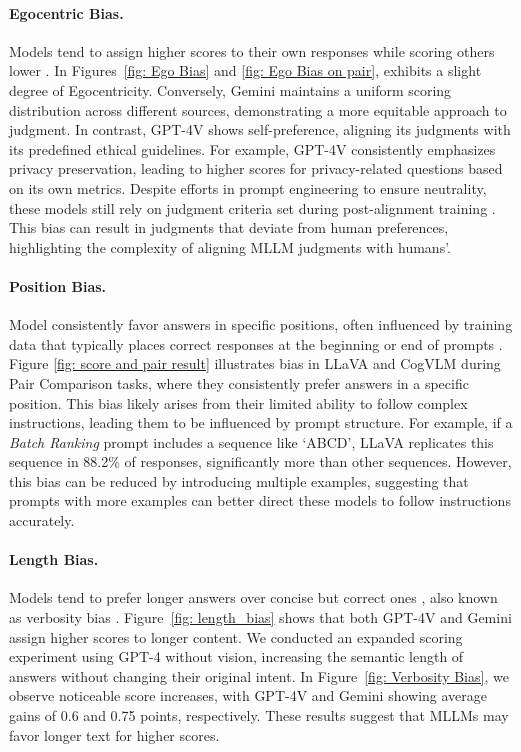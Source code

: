     \paragraph{Egocentric Bias.}
    Models tend to assign higher scores to their own responses while scoring others lower \citep{zheng2023judging, li2024leveraging}. In Figures~\ref{fig: Ego Bias} and \ref{fig: Ego Bias on pair},  exhibits a slight degree of Egocentricity. Conversely, Gemini maintains a uniform scoring distribution across different sources, demonstrating a more equitable approach to judgment. In contrast, GPT-4V shows self-preference, aligning its judgments with its predefined ethical guidelines. For example, GPT-4V consistently emphasizes privacy preservation, leading to higher scores for privacy-related questions based on its own metrics. Despite efforts in prompt engineering to ensure neutrality, these models still rely on judgment criteria set during post-alignment training \citep{ouyang2022training}. This bias can result in judgments that deviate from human preferences, highlighting the complexity of aligning MLLM judgments with humans'.
    
    \paragraph{Position Bias.}
    Model consistently favor answers in specific positions, often influenced by training data that typically places correct responses at the beginning or end of prompts \citep{liu2023lost}. Figure \ref{fig: score and pair result} illustrates bias in LLaVA and CogVLM during Pair Comparison tasks, where they consistently prefer answers in a specific position. This bias likely arises from their limited ability to follow complex instructions, leading them to be influenced by prompt structure. For example, if a \textit{Batch Ranking} prompt includes a sequence like `ABCD’, LLaVA replicates this sequence in 88.2\% of responses, significantly more than other sequences. However, this bias can be reduced by introducing multiple examples, suggesting that prompts with more examples can better direct these models to follow instructions accurately.
    
    \paragraph{Length Bias.}
    Models tend to prefer longer answers over concise but correct ones \citep{li2024leveraging}, also known as verbosity bias \citep{zheng2023judging}. Figure~\ref{fig: length_bias} shows that both GPT-4V and Gemini assign higher scores to longer content. We conducted an expanded scoring experiment using GPT-4 \citep{openai2023gpt4} without vision, increasing the semantic length of answers without changing their original intent. In Figure~\ref{fig: Verbosity Bias}, we observe noticeable score increases, with GPT-4V and Gemini showing average gains of 0.6 and 0.75 points, respectively. These results suggest that MLLMs may favor longer text for higher scores.

